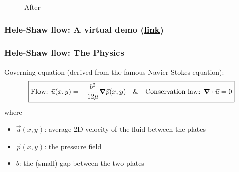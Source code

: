 \documentclass{beamer}
\begin{document}
\begin{frame}
\begin{figure}[!tbp]
\begin{minipage}[b]{0.4\textwidth}
    \caption{After}
    \end{minipage}
    \label{fig:cells}
\end{figure}
\end{frame}



\begin{frame}
\frametitle{Hele-Shaw flow: A virtual demo (\href{https://www.youtube.com/watch?v=HZ3CYY0zKGQ&ab_channel=WilliamJewellCollege}{\underline{\textcolor{black}{link}}})}

\begin{center}
\end{center}
\end{frame}


\begin{frame}
\frametitle{Hele-Shaw flow: The Physics}
Governing equation \cite{Saffman} (derived from the famous Navier-Stokes equation):
\begin{equation*}
    \boxed{\mbox{Flow: }\vec{u}(x,y) = -\frac{b^2}{12\mu} \grad \vec{p}(x,y) \quad \& \quad \mbox{Conservation law: } \grad \cdot \vec{u} = 0}
\end{equation*}
where
\begin{itemize}
    \item $\vec{u}(x,y)$: average 2D velocity of the fluid between the plates
    \item $\vec{p}(x,y)$: the pressure field
    \item $b$: the (small) gap between the two plates
\end{itemize}


\end{frame}
\end{document}
